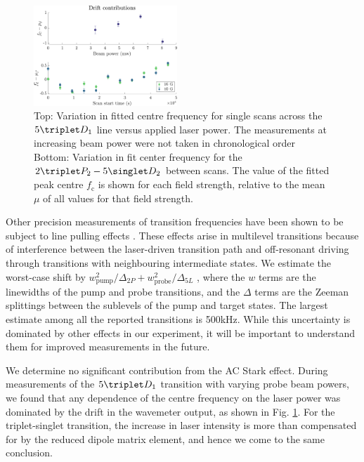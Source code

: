 \begin{figure}[t]
\includegraphics[width=0.48\textwidth]{fig/spectroscopy/power-drift-combined-eps-converted-to.pdf}
\caption{Top: Variation in fitted centre frequency for single scans across the $5\triplet D_1$ line versus applied laser power. The measurements at increasing beam power were not taken in chronological order Bottom: Variation in fit center frequency for the $2\triplet P_2 - 5\singlet D_2$ between scans. The value of the fitted peak centre $f_\textrm{c}$ is shown for each field strength, relative to the mean $\mu$ of all values for that field strength.}
\label{fig:power_drift_combined}
\end{figure}

Other precision measurements of transition frequencies have been shown to be subject to line pulling effects \cite{Marsman15,Marsman15PRA}. These effects arise in multilevel transitions because of interference between the laser-driven transition path and off-resonant driving through transitions with neighbouring intermediate states. We estimate the worst-case shift by $w_{\text{pump}}^2/\Delta_{2P} + w_{\text{probe}}^2/\Delta_{5L}$ \cite{Marsman15,Marsman15PRA}, where the $w$ terms are the linewidths of the pump and probe transitions, and the $\Delta$ terms are the Zeeman splittings between the sublevels of the pump and target states. The largest estimate among all the reported transitions is 500kHz. While this uncertainty is dominated by other effects in our experiment, it will be important to understand them for improved measurements in the future.


We determine no significant contribution from the AC Stark effect. During measurements of the $5\triplet D_1$ transition with varying probe beam powers, we found that any dependence of the centre frequency on the laser power was dominated by the drift in the wavemeter output, as shown in Fig. \ref{fig:power_drift_combined}. For the triplet-singlet transition, the increase in laser intensity is more than compensated for by the reduced dipole matrix element, and hence we come to the same conclusion. 



